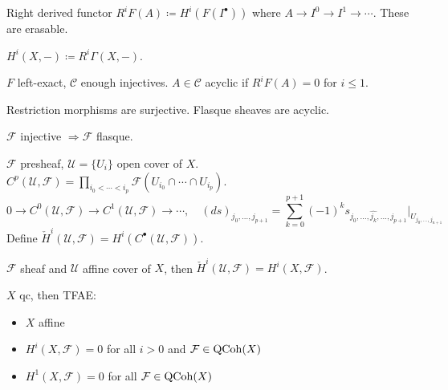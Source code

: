 \begin{definition} Right derived functor $R^iF(A) \coloneqq H^i(F(I^\bullet))$ where $A \to I^0 \to I^1 \to \cdots $. These are erasable.
\end{definition}

\begin{definition} $H^i(X, -) \coloneqq R^i\Gamma(X, -)$.
\end{definition}

\begin{definition} $F$ left-exact, $\mathcal{C} $ enough injectives. $A \in \mathcal{C} $ acyclic if $R^iF(A) = 0 $ for $i \leq 1$. 
\end{definition}

\begin{definition}[Flasque] Restriction morphisms are surjective. Flasque sheaves are acyclic.
\end{definition}

\begin{proposition} 
$\mathcal{F}$ injective $ \Rightarrow \mathcal{F} $ flasque.
\end{proposition}

\begin{definition}[Cech] $\mathcal{F} $ presheaf, $\mathcal{U} = \{ U_i \}$ open cover of $X$. $C^p(\mathcal{U}, \mathcal{F}) = \prod_{i_0 < \cdots < i_p} \mathcal{F}(U_{i_0} \cap \cdots \cap U_{i_p})$.
\[
0 \to C^0(\mathcal{U}, \mathcal{F}) \to C^1(\mathcal{U}, \mathcal{F}) \to \cdots, \quad  (ds)_{j_0, \ldots, j_{p+1}} = \sum_{k=0}^{p+1} (-1)^k s_{j_0, \ldots, \hat{j_k}, \ldots, j_{p+1}}|_{U_{j_0, \ldots, j_{n+1}}}
\]
Define $\check{H}^i(\mathcal{U}, \mathcal{F}) = H^i(C^\bullet(\mathcal{U}, \mathcal{F}))$.
\end{definition}

\begin{theorem} $\mathcal{F} $ sheaf and $\mathcal{U} $ affine cover of $X$, then $\check{H}^i(\mathcal{U}, \mathcal{F}) = H^i(X, \mathcal{F})$.
\end{theorem}

\begin{theorem} $X$ qc, then TFAE:
    \begin{itemize}[topsep=-6pt, itemsep=0pt]
        \item $X$ affine
        \item $H^i(X, \mathcal{F}) = 0$ for all $i > 0$ and $\mathcal{F} \in \operatorname{QCoh}(X)$
        \item $H^1(X, \mathcal{F}) = 0$ for all $\mathcal{F} \in \operatorname{QCoh}(X)$
    \end{itemize}
\end{theorem}

